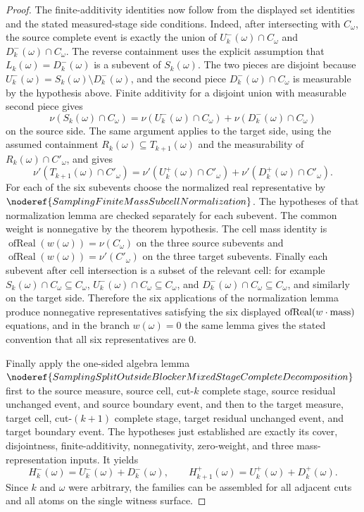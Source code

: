 \begin{proof}
The finite-additivity identities now follow from the displayed set
identities and the stated measured-stage side conditions.  Indeed, after
intersecting with \(C_\omega\), the source complete event is exactly the
union of \(U^-_k(\omega)\cap C_\omega\) and
\(D^-_k(\omega)\cap C_\omega\).  The reverse containment uses the explicit
assumption that \(L_k(\omega)=D^-_k(\omega)\) is a subevent of
\(S_k(\omega)\).  The two pieces are disjoint because
\(U^-_k(\omega)=S_k(\omega)\setminus D^-_k(\omega)\), and the second piece
\(D^-_k(\omega)\cap C_\omega\) is measurable by the hypothesis above.
Finite additivity for a disjoint union with measurable second piece gives
\[
\nu(S_k(\omega)\cap C_\omega)
=\nu(U^-_k(\omega)\cap C_\omega)+\nu(D^-_k(\omega)\cap C_\omega)
\]
on the source side.  The same argument applies to the target side, using the
assumed containment \(R_k(\omega)\subseteq T_{k+1}(\omega)\) and the
measurability of \(R_k(\omega)\cap C'_\omega\), and gives
\[
\nu'(T_{k+1}(\omega)\cap C'_\omega)
=\nu'(U^+_k(\omega)\cap C'_\omega)+\nu'(D^+_k(\omega)\cap C'_\omega).
\]
For each of the six subevents choose the normalized real representative by
\(\noderef{SamplingFiniteMassSubcellNormalization}\).  The hypotheses of
that normalization lemma are checked separately for each subevent.  The
common weight is nonnegative by the theorem hypothesis.  The cell mass
identity is
\(\operatorname{ofReal}(w(\omega))=\nu(C_\omega)\) on the three source
subevents and
\(\operatorname{ofReal}(w(\omega))=\nu'(C'_\omega)\) on the three target
subevents.  Finally each subevent after cell intersection is a subset of
the relevant cell: for example
\(S_k(\omega)\cap C_\omega\subseteq C_\omega\),
\(U^-_k(\omega)\cap C_\omega\subseteq C_\omega\), and
\(D^-_k(\omega)\cap C_\omega\subseteq C_\omega\), and similarly on the
target side.  Therefore the six applications of the normalization lemma
produce nonnegative representatives satisfying the six displayed
\(\operatorname{ofReal}(w\cdot\hbox{mass})\) equations, and in the branch
\(w(\omega)=0\) the same lemma gives the stated convention that all six
representatives are \(0\).

Finally apply the one-sided algebra lemma
\(\noderef{SamplingSplitOutsideBlockerMixedStageCompleteDecomposition}\)
first to the source measure, source cell, cut-\(k\) complete stage,
source residual unchanged event, and source boundary event, and then to the
target measure, target cell, cut-\((k+1)\) complete stage, target residual
unchanged event, and target boundary event.  The hypotheses just established
are exactly its cover, disjointness, finite-additivity, nonnegativity,
zero-weight, and three mass-representation inputs.  It yields
\[
H^-_k(\omega)=U^-_k(\omega)+D^-_k(\omega),\qquad
H^+_{k+1}(\omega)=U^+_k(\omega)+D^+_k(\omega).
\]
Since \(k\) and \(\omega\) were arbitrary, the families can be assembled for
all adjacent cuts and all atoms on the single witness surface.
\end{proof}
